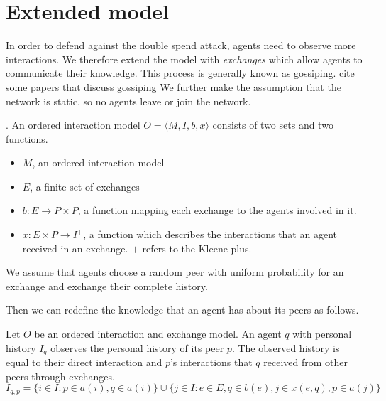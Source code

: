 \section{Extended model}
In order to defend against the double spend attack, agents need to observe more interactions. We 
therefore extend the model with \textit{exchanges} which allow agents to communicate their knowledge.
This process is generally known as gossiping. {\color{red} cite some papers that discuss gossiping}
We further make the assumption that the network is static, so no agents leave or join the network.

\begin{defn}. An ordered interaction model $O = \langle M, I, b, x \rangle$
    consists of two sets and two functions. 
    \begin{itemize}
        \item $M$, an ordered interaction model
        \item $E$, a finite set of exchanges
        \item $b : E \rightarrow P \times P$, a function mapping each exchange to the agents involved in it.
        \item $x : E \times P \rightarrow I^+$, a function which describes the interactions that an agent received in an exchange. $+$ refers to the Kleene plus.
    \end{itemize}

    We assume that agents choose a random peer with uniform probability for an exchange and 
    exchange their complete history.
\end{defn}

Then we can redefine the knowledge that an agent has about its peers as follows.

\begin{defn} 
    \label{def:peer_history}
    Let $O$ be an ordered interaction and exchange model. An agent $q$ with personal history $I_q$ 
    observes the personal history of its peer $p$. The observed history is equal to their direct 
    interaction and $p$'s interactions that $q$ received from other peers through exchanges.
    \[ I_{q,p} = \{ i \in I : p \in a(i), q \in a(i) \} \cup \{ j \in I : e \in E, q \in b(e), j \in x(e, q), p \in a(j)\}\]
\end{defn}

